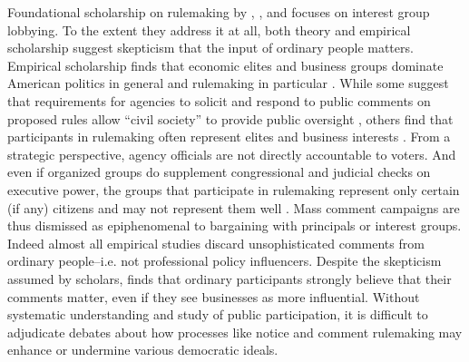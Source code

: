 Foundational scholarship on rulemaking by \citet{Furlong2004}, \citet{Furlong1997, Furlong1998}, and \citet{Kerwin2011} focuses on interest group lobbying. To the extent they address it at all, both theory and empirical scholarship suggest skepticism that the input of ordinary people matters. 
Empirical scholarship finds that economic elites and business groups dominate American politics in general \citep{Gilens2014} and rulemaking in particular \citep{Crow2015, Wagner2011, West2009, Yackee2006JOP, Yackee2006JPART, Yackee2012, Golden1998, Haeder2015}. %
While some suggest that requirements for agencies to solicit and respond to public comments on proposed rules allow ``civil society'' to provide public oversight \citep{Michaels2015, Metzger2010}, others find that participants in rulemaking often represent elites \citep{Seifter2016UCLA} and business interests \citep{Yackee2006JOP}.
From a strategic perspective, agency officials are not directly accountable to voters. And even if organized groups do supplement congressional and judicial checks on executive power, the groups that participate in rulemaking represent only certain (if any) citizens and may not represent them well \citep{Seifter2016UCLA}. 
Mass comment campaigns are thus dismissed as epiphenomenal to bargaining with principals or interest groups. Indeed almost all empirical studies discard unsophisticated comments from ordinary people--i.e. not professional policy influencers.
Despite the skepticism assumed by scholars, \citet{Yackee2015JPART} finds that ordinary participants strongly believe that their comments matter, even if they see businesses as more influential.
Without systematic understanding and study of public participation, it is difficult to adjudicate debates about how processes like notice and comment rulemaking may enhance or undermine various democratic ideals.


